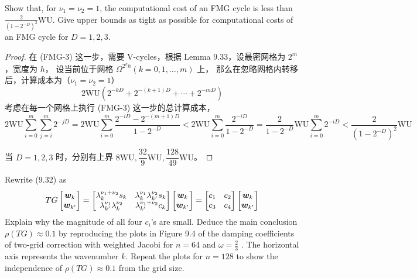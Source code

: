 \documentclass[lang=cn,a4paper,newtx,bibend=bibtex]{elegantpaper}
\begin{document}
\begin{prob}[Exercise 9.35]
  Show that, for $\nu_1 = \nu_2 = 1$, the computational cost of 
  an FMG cycle is less than $\frac2{(1-2^{-D})^2} \text{WU}$. Give
  upper bounds as tight as possible for computational costs of
  an FMG cycle for $D = 1, 2, 3$.
\end{prob}

\begin{proof}
  在 (FMG-3) 这一步，需要 V-cycles，根据 Lemma 9.33，设最密网格为 $2^m$，宽度为 $h$，
  设当前位于网格 $\Omega^{2^k h}(k = 0, 1, \dots, m)$ 上，
  那么在忽略网格内转移后，计算成本为（$\nu_1 = \nu_2 = 1$）
  \[
    2\text{WU} (2^{-kD} + 2^{-(k+1)D} + \cdots + 2^{-mD})
  \]
  考虑在每一个网格上执行 (FMG-3) 这一步的总计算成本，
  \[
    2\text{WU} \sum_{i = 0}^{m} \sum_{j = i}^{m} 2^{-jD} 
   = 2\text{WU} \sum_{i = 0}^m \dfrac{2^{-iD} - 2^{-(m+1)D}}{1 - 2^{-D}}
   < 2\text{WU} \sum_{i = 0}^m \dfrac{2^{-iD}}{1 - 2^{-D}}
   = \dfrac{2}{1 - 2^{-D}}\text{WU} \sum_{i = 0}^m 2^{-iD}
   < \dfrac{2}{(1 - 2^{-D})^2} \text{WU}
  \]

  当 $D = 1, 2, 3$ 时，分别有上界 $8\text{WU}, \dfrac{32}{9} \text{WU}, \dfrac{128}{49}\text{WU}$。
\end{proof}


\begin{prob}[Exercise 9.41]
Rewrite (9.32) as
\[
  TG \begin{bmatrix}\bm{w}_k \\ \bm{w}_{k'}\end{bmatrix} 
  = \begin{bmatrix}
      \lambda_k^{\nu_1 + \nu_2}s_k &
      \lambda_k^{\nu_1}\lambda_{k'}^{\nu_2}s_k \\
      \lambda_{k'}^{\nu_1}\lambda_k^{\nu_2} &
      \lambda_{k'}^{\nu_1 + \nu_2}c_k
    \end{bmatrix} 
    \begin{bmatrix}\bm{w}_k \\ \bm{w}_{k'}\end{bmatrix}
  = \begin{bmatrix}c_1 & c_2 \\ c_3 & c_4\end{bmatrix} 
    \begin{bmatrix}\bm{w}_k \\ \bm{w}_{k'}\end{bmatrix}  
\]
Explain why the magnitude of all four $c_i$’s are small. Deduce
the main conclusion $\rho(TG) \approx 0.1$ by reproducing the
plots in Figure 9.4 of the damping coefficients of two-grid
correction with weighted Jacobi for $n = 64$ and $\omega = \frac23$
. The horizontal axis represents the wavenumber $k$. Repeat the
plots for $n = 128$ to show the independence of $\rho (T G) \approx 0.1$
from the grid size.
\end{prob}
\end{document}
